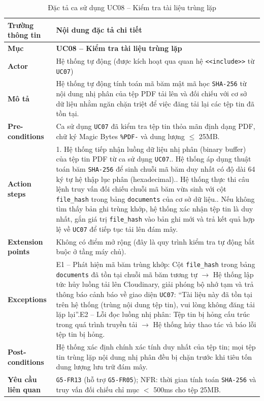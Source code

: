 \begin{table}[H]
\centering
\footnotesize\linespread{1.05}\selectfont
\setlength{\tabcolsep}{5pt}
\renewcommand{\arraystretch}{1.12}
\begin{tabularx}{\textwidth}{|p{3.5cm}|X|}
\hline
\rowcolor[HTML]{EAEAEA}
\textbf{Trường thông tin} & \textbf{Nội dung đặc tả chi tiết} \\
\hline
\textbf{Mục} & \textbf{UC08 -- Kiểm tra tài liệu trùng lặp} \\
\hline
\textbf{Actor} & Hệ thống tự động (được kích hoạt qua quan hệ \texttt{<<include>>} từ \texttt{UC07}) \\
\hline
\textbf{Mô tả} & Hệ thống tự động tính toán mã băm mật mã học \texttt{SHA-256} từ nội dung nhị phân của tệp PDF tải lên và đối chiếu với cơ sở dữ liệu nhằm ngăn chặn triệt để việc đăng tải lại các tệp tin đã tồn tại. \\
\hline
\textbf{Pre-conditions} & Ca sử dụng \texttt{UC07} đã kiểm tra tệp tin thỏa mãn định dạng PDF, chữ ký Magic Bytes \texttt{\%PDF-} và dung lượng $\le$ 25MB. \\
\hline
\textbf{Action steps} & 1. Hệ thống tiếp nhận luồng dữ liệu nhị phân (binary buffer) của tệp tin PDF từ ca sử dụng \texttt{UC07}.\newline 2. Hệ thống áp dụng thuật toán băm \texttt{SHA-256} để sinh chuỗi mã băm duy nhất có độ dài 64 ký tự hệ thập lục phân (hexadecimal).\newline 3. Hệ thống thực thi câu lệnh truy vấn đối chiếu chuỗi mã băm vừa sinh với cột \texttt{file\_hash} trong bảng \texttt{documents} của cơ sở dữ liệu.\newline 4. Nếu không tìm thấy bản ghi trùng khớp, hệ thống xác nhận tệp tin là duy nhất, gắn giá trị \texttt{file\_hash} vào bản ghi mới và trả kết quả hợp lệ về \texttt{UC07} để tiếp tục tải lên đám mây. \\
\hline
\textbf{Extension points} & Không có điểm mở rộng (đây là quy trình kiểm tra tự động bắt buộc ở tầng máy chủ). \\
\hline
\textbf{Exceptions} & E1 -- Phát hiện mã băm trùng khớp: Cột \texttt{file\_hash} trong bảng \texttt{documents} đã tồn tại chuỗi mã băm tương tự $\rightarrow$ Hệ thống lập tức hủy luồng tải lên Cloudinary, giải phóng bộ nhớ tạm và trả thông báo cảnh báo về giao diện \texttt{UC07}: ``Tài liệu này đã tồn tại trên hệ thống (trùng nội dung tệp tin), vui lòng không đăng tải lặp lại''.\newline E2 -- Lỗi đọc luồng nhị phân: Tệp tin bị hỏng cấu trúc trong quá trình truyền tải $\rightarrow$ Hệ thống hủy thao tác và báo lỗi tệp tin bị hỏng. \\
\hline
\textbf{Post-conditions} & Hệ thống xác định chính xác tính duy nhất của tệp tin; mọi tệp tin trùng lặp nội dung nhị phân đều bị chặn trước khi tiêu tốn dung lượng lưu trữ đám mây. \\
\hline
\textbf{Yêu cầu liên quan} & \texttt{G5-FR13} (hỗ trợ \texttt{G5-FR05}); NFR: thời gian tính toán \texttt{SHA-256} và truy vấn đối chiếu chỉ mục $<$ 500ms cho tệp 25MB. \\
\hline
\end{tabularx}
\caption{Đặc tả ca sử dụng UC08 -- Kiểm tra tài liệu trùng lặp}
\label{tab:uc08}
\end{table}
